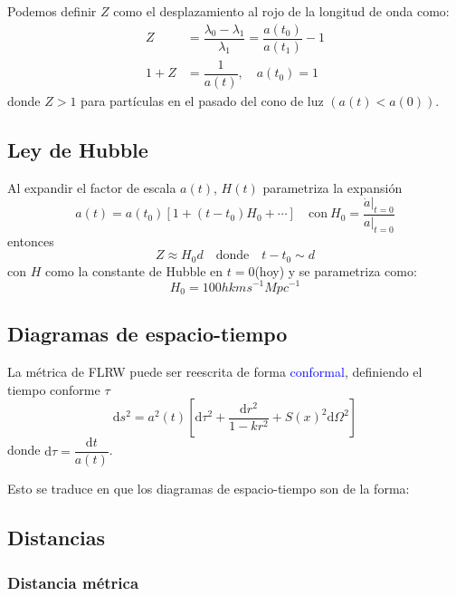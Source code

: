 \documentclass[../main]{subfiles}
\begin{document}
\begin{adjustwidth}{0pt}{-100pt}
Podemos definir $Z$ como el desplazamiento al rojo de la longitud de onda como:
\begin{equation}
    \begin{split}
        Z&=\dfrac{\lambda_0-\lambda_1}{\lambda_1}=\dfrac{a(t_0)}{a(t_1)}-1\\
        1+Z&=\dfrac{1}{a(t)},\quad a(t_0)=1
    \end{split}
\end{equation}
donde $Z>1$ para partículas en el pasado del cono de luz $(a(t)<a(0))$.

\subsection{Ley de Hubble}

Al expandir el factor de escala $a(t)$, $H(t)$ parametriza la expansión
\begin{equation}
    a(t)=a(t_0)\left[1+(t-t_0)H_0+\cdots\right] \quad \text{con} \ H_0=\dfrac{\dot{a} |_{t=0}}{a|_{t=0}}
\end{equation}
entonces 
\begin{equation}
    Z \approx H_0 d \quad \text{donde} \quad t-t_0 \sim d
\end{equation}
con $H$ como la constante de Hubble en $t=0$(hoy) y se parametriza como:
\begin{equation}
    H_0=100 h km s^{-1} Mpc^{-1}
\end{equation}

\subsection{Diagramas de espacio-tiempo}

La métrica de FLRW puede ser reescrita de forma \textcolor{blue}{conformal}, definiendo el tiempo conforme $\tau$
\begin{equation}
    \mathrm{d}s^2=a^2(t)\left[\mathrm{d}\tau^2+\dfrac{\mathrm{d}r^2}{1-kr^2}+S(x)^2\mathrm{d}\Omega^2\right]
\end{equation}
donde $\mathrm{d}\tau=\dfrac{\mathrm{d}t}{a(t)}$.

Esto se traduce en que los diagramas de espacio-tiempo son de la forma:

\subsection{Distancias}

\subsubsection{Distancia métrica}


\end{adjustwidth}
\end{document}
